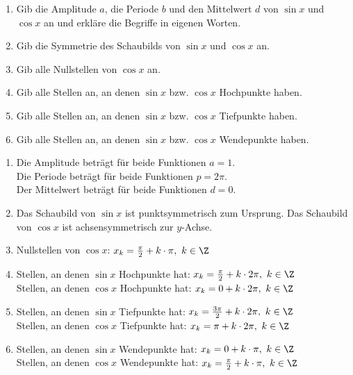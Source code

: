 \begin{Exercise}[title={\raggedright\normalfont}, label=eigenschaftenSinCosA1]
	\begin{enumerate}[label=\alph*)]
		\item Gib die Amplitude \(a\), die Periode \(b\) und den Mittelwert \(d\) von \(\sin x\) und \(\cos x\) an und erkläre die Begriffe in eigenen Worten.
		\item Gib die Symmetrie des Schaubilds von \(\sin x\) und \(\cos x\) an.
		\item Gib alle Nullstellen von \(\cos x\) an.
		\item Gib alle Stellen an, an denen \(\sin x\) bzw. \(\cos x\) Hochpunkte haben.
		\item Gib alle Stellen an, an denen \(\sin x\) bzw. \(\cos x\) Tiefpunkte haben.
		\item Gib alle Stellen an, an denen \(\sin x\) bzw. \(\cos x\) Wendepunkte haben.
	\end{enumerate}
\end{Exercise}



\begin{Answer}[ref=eigenschaftenSinCosA1]
	\begin{enumerate}[label=\alph*)]
		\item Die Amplitude beträgt für beide Funktionen \(a=1\).\\
		Die Periode beträgt für beide Funktionen \(p=2\pi\).\\
		Der Mittelwert beträgt für beide Funktionen \(d=0\).
		\item Das Schaubild von \(\sin x\) ist punktsymmetrisch zum Ursprung. Das Schaubild von \(\cos x\) ist achsensymmetrisch zur \(y\)-Achse.
		\item Nullstellen von \(\cos x\): \(x_k=\frac{\pi}{2}+k\cdot \pi,\ k\in\Z\)
		\item Stellen, an denen \(\sin x\) Hochpunkte hat: 	\(x_k=\frac{\pi}{2}+k\cdot 2\pi,\ k\in\Z\)\\
		Stellen, an denen \(\cos x\) Hochpunkte hat: 	\(x_k=0+k\cdot 2\pi,\ k\in\Z\)
		\item Stellen, an denen \(\sin x\) Tiefpunkte hat: 	\(x_k=\frac{3\pi}{2}+k\cdot 2\pi,\ k\in\Z\)\\
		Stellen, an denen \(\cos x\) Tiefpunkte hat: 	\(x_k=\pi+k\cdot 2\pi,\ k\in\Z\)
		\item Stellen, an denen \(\sin x\) Wendepunkte hat: 	\(x_k=0+k\cdot \pi,\ k\in\Z\)\\
		Stellen, an denen \(\cos x\) Wendepunkte hat: 	\(x_k=\frac{\pi}{2}+k\cdot \pi,\ k\in\Z\)
	\end{enumerate}
\end{Answer}
